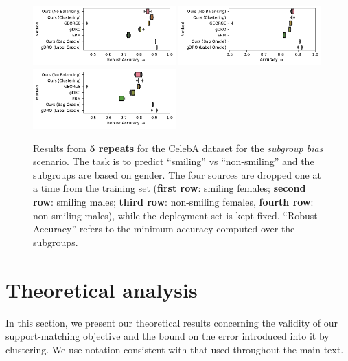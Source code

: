 \begin{figure}[htp]
  \includegraphics[width=0.49\textwidth]{supmatch/figures/celeba/supmat/no_unsmiling_females/celeba_gender_smiling_acc-min.pdf}
 \includegraphics[width=0.49\textwidth]{supmatch/figures/celeba/supmat/no_unsmiling_males/celeba_gender_smiling_acc.pdf}
  \includegraphics[width=0.49\textwidth]{supmatch/figures/celeba/supmat/no_unsmiling_males/celeba_gender_smiling_acc-min.pdf}
\caption{
    Results from \textbf{5 repeats} for the CelebA dataset for the \emph{subgroup bias} scenario.
    The task is to predict ``smiling'' vs ``non-smiling'' and the subgroups are based on gender.
    The four sources are dropped one at a time from the training set
    (\textbf{first row}: smiling females; \textbf{second row}: smiling males; \textbf{third row}:
    non-smiling females, \textbf{fourth row}: non-smiling males), while the deployment set is kept
    fixed. ``Robust Accuracy'' refers to the minimum accuracy computed over the subgroups. 
  }%
 \label{fig:celeba-gender-smiling-full}
\end{figure}

\section{Theoretical analysis}\label{sec:theoretical-analysis}
In this section, we present our theoretical results concerning the validity of our support-matching
objective and the bound on the error introduced into it by clustering. We use notation consistent
with that used throughout the main text.

